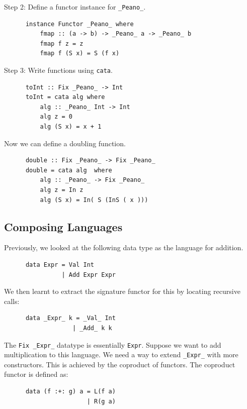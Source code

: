 \documentclass[a4paper,12pt]{article}
\theoremstyle{remark}
\begin{document}
  Step 2: Define a functor instance for \lstinline{_Peano_}.

  \begin{lstlisting}
      instance Functor _Peano_ where
          fmap :: (a -> b) -> _Peano_ a -> _Peano_ b
          fmap f z = z
          fmap f (S x) = S (f x)  \end{lstlisting}

  Step 3: Write functions using \lstinline{cata}.

  \begin{lstlisting}
      toInt :: Fix _Peano_ -> Int
      toInt = cata alg where
          alg :: _Peano_ Int -> Int
          alg z = 0
          alg (S x) = x + 1  \end{lstlisting}

  Now we can define a doubling function.

  \begin{lstlisting}
      double :: Fix _Peano_ -> Fix _Peano_
      double = cata alg  where
          alg :: _Peano_ -> Fix _Peano_
          alg z = In z
          alg (S x) = In( S (InS ( x )))  \end{lstlisting}

  \subsection{Composing Languages}

  Previously, we looked at the following data type as the language for addition.

  \begin{lstlisting}
      data Expr = Val Int
                | Add Expr Expr  \end{lstlisting}

  We then learnt to extract the signature functor for this by locating recursive calls:

  \begin{lstlisting}
      data _Expr_ k = _Val_ Int
                   | _Add_ k k  \end{lstlisting}

  The \lstinline{Fix _Expr_} datatype is essentially \lstinline{Expr}. Suppose we want to add multiplication
  to this language. We need a way to extend \lstinline{_Expr_} with more constructors. This is
  achieved by the coproduct of functors. The coproduct functor is defined as:

  \begin{lstlisting}
      data (f :+: g) a = L(f a)
                       | R(g a)  \end{lstlisting}
\end{document}
